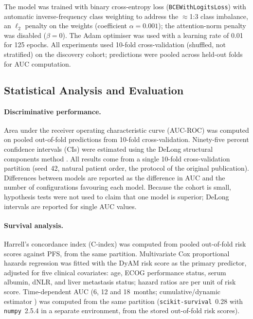 The model was trained with binary cross-entropy loss
(\texttt{BCEWithLogitsLoss}) with automatic inverse-frequency class
weighting to address the $\approx$1:3 class imbalance,
an $\ell_2$ penalty on the weights (coefficient $\alpha = 0.001$);
the attention-norm penalty was disabled ($\beta = 0$).
The Adam optimiser was used with a learning rate of 0.01 for 125 epochs.
All experiments used 10-fold cross-validation (shuffled, not stratified) on the
discovery cohort; predictions were pooled across held-out folds for
AUC computation.


\subsection{Statistical Analysis and Evaluation}
\label{sec:stats}

\paragraph{Discriminative performance.}
Area under the receiver operating characteristic curve (AUC-ROC) was
computed on pooled out-of-fold predictions from 10-fold cross-validation.
Ninety-five percent confidence intervals (CIs) were estimated using the
DeLong structural components method \cite{DeLong1988}.
All results come from a single 10-fold cross-validation partition (seed~42, natural patient order, the
protocol of the original publication). Differences between models are reported as the difference in AUC and the
number of configurations favouring each model. Because the cohort is small, hypothesis tests were not
used to claim that one model is superior; DeLong intervals are reported for single AUC values.

\paragraph{Survival analysis.}
Harrell's concordance index (C-index) \cite{Harrell1996} was computed from
pooled out-of-fold risk scores against PFS, from the same partition.
Multivariate Cox proportional hazards regression was fitted with the
DyAM risk score as the primary predictor, adjusted for five clinical
covariates: age, ECOG performance status, serum albumin, dNLR, and
liver metastasis status; hazard ratios are per unit of risk score.
Time-dependent AUC (6, 12 and 18~months; cumulative/dynamic estimator
\cite{Uno2007,Hung2010}) was computed from the same partition
(\texttt{scikit-survival}~0.28 with \texttt{numpy}~2.5.4 in a separate environment, from the stored out-of-fold
risk scores).

